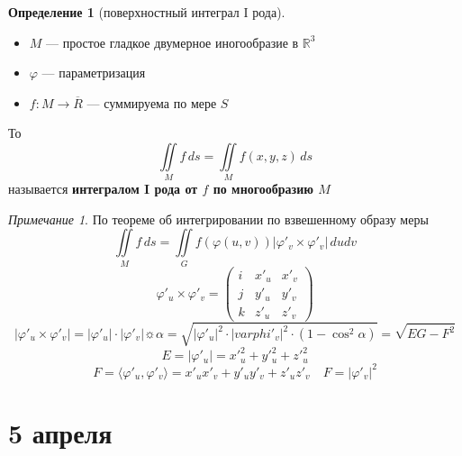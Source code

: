 \documentclass[oneside]{book}
\newcommand{\R}{\mathbb{R}}
\newcommand{\A}{\mathfrak{A}}
\theoremstyle{plain}
\theoremstyle{remark}
\newtheorem*{remark}{Примечание}
\theoremstyle{definition}
\newtheorem*{definition}{Определение}
\begin{document}
\begin{definition}[поверхностный интеграл I рода]
\-
\begin{itemize}
\item \(M\) --- простое гладкое двумерное иногообразие в \(\R^3\)
\item \(\varphi\) --- параметризация
\item \(f: M \to \overline{R}\) --- суммируема по мере \(S\)
\end{itemize}
То \[ \iint\limits_M f\,ds = \iint\limits_M f(x, y, z)\,ds \]
называется \textbf{интегралом I рода от \(f\) по многообразию \(M\)}
\end{definition}
\begin{remark}
По теореме об интегрировании по взвешенному образу меры
\[ \iint\limits_M f\,ds = \iint\limits_G f(\varphi(u, v)) |\varphi'_v \times \varphi'_v|\,dudv \]
\[ \varphi'_u \times \varphi'_v = \begin{pmatrix}
i & x'_u & x'_v \\
j & y'_u & y'_v \\
k & z'_u & z'_v
\end{pmatrix}\]
\[ |\varphi'_u \times \varphi'_v| = |\varphi'_u| \cdot |\varphi'_v|\sun\alpha = \sqrt{|\varphi'_u|^2 \cdot |varphi'_v|^2 \cdot (1 - \cos^2\alpha)} = \sqrt{EG - F^2} \]
\[ E = |\varphi'_u| = x'_u^2 + y'_u^2 + z'_u^2 \]
\[ F = \langle \varphi'_u, \varphi'_v \rangle = x'_ux'_v + y'_uy'_v + z'_u z'_v \quad F = |\varphi'_v|^2 \]
\end{remark}
\chapter{5 апреля}
\label{sec:orga8ca467}
\newcommand{\A}{\mathfrak{A}}
\newcommand{\esssup}{\mathop{\rm ess\,sup}\limits}
\end{document}
